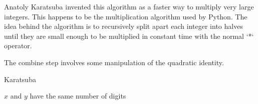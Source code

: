 \documentclass{standalone}
\begin{document}
Anatoly Karatsuba invented this algorithm as a faster way to multiply very large
integers.
This happens to be the multiplication algorithm used by Python. The idea behind
the algorithm is to recursively split apart each integer into halves until they
are small enough to be multiplied in constant time with the normal `*` operator.

The combine step involves some manipulation of the quadratic identity.

\begin{algorithm}
  \caption{Karatsuba}
  \begin{algorithmic}
    \Require $x$ and $y$ have the same number of digits
  \end{algorithmic}
\end{algorithm}
\end{document}
